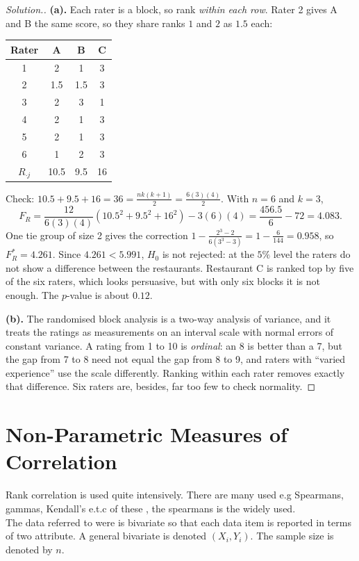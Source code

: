 \documentclass[11pt,a4paper]{article}
\theoremstyle{definition}
\newenvironment{solution}
  {\renewcommand{\qedsymbol}{}\begin{proof}[\textit{Solution}.]}
  {\end{proof}}
\begin{document}
\begin{solution}
\textbf{(a).} Each rater is a block, so rank \emph{within each row}. Rater 2 gives A and
B the same score, so they share ranks $1$ and $2$ as $1.5$ each:
\begin{center}
\begin{tabular}{c|ccc}
Rater & A & B & C\\\hline
1 & 2 & 1 & 3\\
2 & 1.5 & 1.5 & 3\\
3 & 2 & 3 & 1\\
4 & 2 & 1 & 3\\
5 & 2 & 1 & 3\\
6 & 1 & 2 & 3\\\hline
$R_{\cdot j}$ & 10.5 & 9.5 & 16
\end{tabular}
\end{center}
Check: $10.5+9.5+16 = 36 = \frac{nk(k+1)}{2} = \frac{6(3)(4)}{2}$. With $n = 6$ and $k = 3$,
\[F_R = \frac{12}{6(3)(4)}\left(10.5^{2}+9.5^{2}+16^{2}\right)-3(6)(4)
 = \frac{456.5}{6}-72 = 4.083.\]
One tie group of size 2 gives the correction
$1-\frac{2^{3}-2}{6(3^{3}-3)} = 1-\frac{6}{144} = 0.958$, so $F_R^{*} = 4.261$. Since
$4.261 < 5.991$, $H_0$ is not rejected: at the $5\%$ level the raters do not show a
difference between the restaurants. Restaurant C is ranked top by five of the six
raters, which looks persuasive, but with only six blocks it is not enough. The
$p$-value is about $0.12$.

\textbf{(b).} The randomised block analysis is a two-way analysis of variance, and it
treats the ratings as measurements on an interval scale with normal errors of constant
variance. A rating from 1 to 10 is \emph{ordinal}: an 8 is better than a 7, but the
gap from 7 to 8 need not equal the gap from 8 to 9, and raters with ``varied
experience'' use the scale differently. Ranking within each rater removes exactly that
difference. Six raters are, besides, far too few to check normality.
\end{solution}


\section{Non-Parametric Measures of Correlation}
Rank  correlation is used quite intensively. There are many used e.g  Spearmans, gammas, Kendall's e.t.c of these , the spearmans is the widely used.\\ 
The data referred to were is bivariate so that each data item is reported in terms of two attribute. A general bivariate is denoted $(X_i,Y_i)$. The sample size is denoted by $n$.\\
\end{document}
